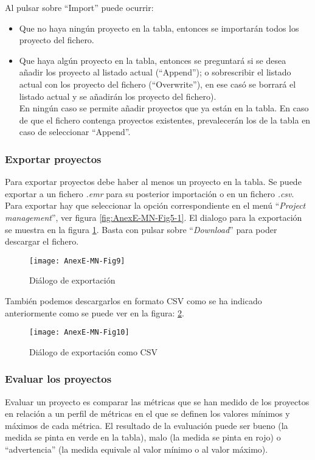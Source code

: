 Al pulsar sobre ``Import'' puede ocurrir:
\begin{itemize}
	\item Que no haya ningún proyecto en la tabla, entonces se importarán todos los proyecto del fichero.
	\item Que haya algún proyecto en la tabla, entonces se preguntará si se desea añadir los proyecto al listado actual (``Append''); o sobrescribir el listado actual con los proyecto del fichero (``Overwrite''), en ese casó se borrará el listado actual y se añadirán los proyecto del fichero).\\
	En ningún caso se permite añadir proyectos que ya están en la tabla. En caso de que el fichero contenga proyectos existentes, prevalecerán los de la tabla en caso de seleccionar ``Append''.
\end{itemize}


\subsubsection{Exportar proyectos}
Para exportar proyectos debe haber al menos un proyecto en la tabla.
Se puede exportar a un fichero \textit{.emr} para su posterior importación o en un fichero \textit{.csv}. Para exportar hay que seleccionar la opción correspondiente en el menú ``\textit{Project management}'', ver figura \ref{fig:AnexE-MN-Fig5-1}. El dialogo para la exportación se muestra en la figura \ref{fig:AnexE-MN-Fig9}. Basta con pulsar sobre ``\textit{Download}'' para poder descargar el fichero.
\begin{figure}[!h]
	\centering
	\texttt{[image: AnexE-MN-Fig9]}
	\caption{Diálogo de exportación}\label{fig:AnexE-MN-Fig9}
\end{figure}
\FloatBarrier

También podemos descargarlos en formato CSV como se ha indicado anteriormente como se puede ver en la figura: \ref{fig:AnexE-MN-Fig10}.
\begin{figure}[!h]
	\centering
	\texttt{[image: AnexE-MN-Fig10]}
	\caption{Diálogo de exportación como CSV}\label{fig:AnexE-MN-Fig10}
\end{figure}
\FloatBarrier


\subsubsection{Evaluar los proyectos}
Evaluar un proyecto es comparar las métricas que se han medido de los proyectos en relación a un perfil de métricas en el que se definen los valores mínimos y máximos de cada métrica. El resultado de la evaluación puede ser bueno (la medida se pinta en verde en la tabla), malo (la medida se pinta en rojo) o ``advertencia'' (la medida equivale al valor mínimo o al valor máximo).


